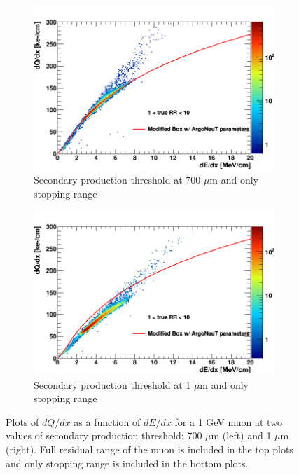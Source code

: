 \begin{figure}[bp!]
\begin{subfigure}[b]{0.495\textwidth}
            \centering 
            \includegraphics[width=\textwidth]{mu_700um_lowRR}
            \caption{Secondary production threshold at 700 $\mu$m and only stopping range}%
            \label{fig:mu_2d_700_lowRR}
        \end{subfigure}
        \hfill
        \begin{subfigure}[b]{0.495\textwidth}   
            \centering 
            \includegraphics[width=\textwidth]{mu_1um_lowRR}
            \caption{Secondary production threshold at 1 $\mu$m and only stopping range}%
            \label{fig:mu_2d_1_lowRR}
        \end{subfigure}
        \caption{
		Plots of $dQ/dx$ as a function of $dE/dx$ for a 1 GeV muon at two values of secondary production threshold: 700 $\mu$m (left) and 1 $\mu$m (right). 
		Full residual range of the muon is included in the top plots and only stopping range is included in the bottom plots.
	}
        \label{fig:muon_2d}
\end{figure}
